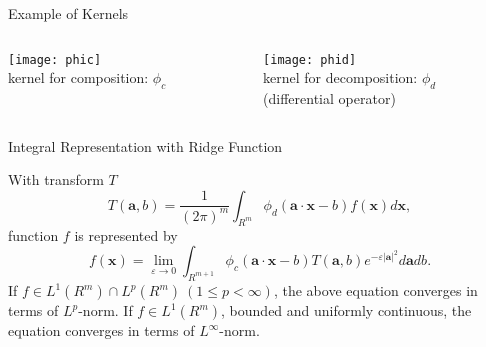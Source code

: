 \documentclass[fleqn,aspectratio=1610]{beamer}
\begin{document}
\begin{frame}[label={sec:orge18f2a8}]{Example of Kernels}
\begin{columns}
\begin{column}{0.5\columnwidth}
\begin{center}
\texttt{[image: phic]}\\[0pt]
kernel for composition: \(\phi_c\) \\[0pt]
\phantom{(differential operator)}
\end{center}
\end{column}
\begin{column}{0.5\columnwidth}
\begin{center}
\texttt{[image: phid]}\\[0pt]
kernel for decomposition: \(\phi_d\) \\[0pt]
(differential operator)
\end{center}
\end{column}
\end{columns}
\end{frame}

\begin{frame}[label={sec:org178c0dd}]{Integral Representation with Ridge Function}
\begin{theorem}[NM 1996]\label{sec:orgbb1dc29}
With transform \(T\) 
\begin{equation}
  T(\boldsymbol{a},b)
  =\frac{1}{(2\pi)^{m}}
  \int_{R^{m}}\phi_{d}(\boldsymbol{a}\cdot\boldsymbol{x}-b)
  f(\boldsymbol{x})d\boldsymbol{x},
\end{equation}
function \(f\) is represented by
\begin{equation}
  f(\boldsymbol{x})
  =\lim_{\varepsilon\to0}\int_{R^{m+1}}
  \phi_{c}(\boldsymbol{a}\cdot\boldsymbol{x}-b)
  T(\boldsymbol{a},b)e^{-\varepsilon|\boldsymbol{a}|^2}d\boldsymbol{a}db.
\end{equation}
If \(f\in L^{1}(R^{m})\cap L^{p}(R^{m})\ (1\leq p<\infty)\),
the above equation converges in terms of \(L^{p}\)-norm.
If \(f\in L^{1}(R^{m})\), bounded and uniformly continuous,
the equation converges in terms of \(L^{\infty}\)-norm.
\end{theorem}
\end{frame}
\end{document}
